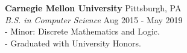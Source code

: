 \documentclass[margin, 10pt]{res} %
\begin{document}
\begin{resume}
{\bf Carnegie Mellon University} \hfill Pittsburgh, PA\\
{\it B.S. in Computer Science} \hfill Aug 2015 - May 2019 \\
\hphantom{12}- Minor: Discrete Mathematics and Logic.\\
\hphantom{12}- Graduated with University Honors.







\end{resume}
\end{document}
